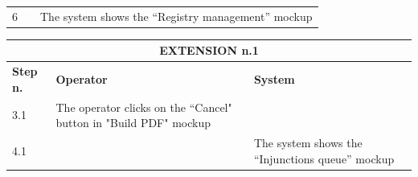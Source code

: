 {{{\begin{center}
\begin{tabular}{|p{2cm}|p{6cm}|p{6cm}|}
				\vspace{1mm} \vspace{1mm} \\
			\hline
				\vspace{1mm} 6\vspace{1mm} &
				\vspace{1mm} \vspace{1mm} & 
				\vspace{1mm} The system shows the “Registry management” mockup\vspace{1mm} \\
			\hline
			\end{tabular}

			\begin{tabular}{|p{2cm}|p{6cm}|p{6cm}|}
			\hline
				\multicolumn{3}{|c|}{EXTENSION n.1}\\
			\hline
				\centering \vspace{1mm} \bfseries{Step n.} \vspace{1mm} & \vspace{1mm} \bfseries{Operator} \vspace{1mm} & \vspace{1mm} \bfseries{System} \vspace{1mm}\\
			\hline
				\vspace{1mm} 3.1\vspace{1mm} &
				\vspace{1mm} The operator clicks on the “Cancel" button in "Build PDF" mockup\vspace{1mm} & 
				\vspace{1mm} \vspace{1mm} \\
			\hline
				\vspace{1mm} 4.1\vspace{1mm} &
				\vspace{1mm} \vspace{1mm} & 
				\vspace{1mm} The system shows the “Injunctions queue” mockup\vspace{1mm} \\
			\hline
			\end{tabular}


\end{center}}}}
